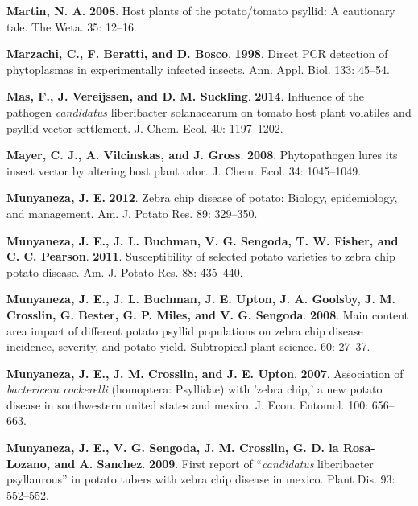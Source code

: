 \documentclass[]{article}
\begin{document}
\leavevmode\hypertarget{ref-Martin2008}{}%
\textbf{Martin, N. A.} \textbf{2008}. Host plants of the potato/tomato
psyllid: A cautionary tale. The Weta. 35: 12--16.

\leavevmode\hypertarget{ref-Marzachi1998}{}%
\textbf{Marzachi, C., F. Beratti, and D. Bosco}. \textbf{1998}. Direct
PCR detection of phytoplasmas in experimentally infected insects. Ann.
Appl. Biol. 133: 45--54.

\leavevmode\hypertarget{ref-Mas2014}{}%
\textbf{Mas, F., J. Vereijssen, and D. M. Suckling}. \textbf{2014}.
Influence of the pathogen \emph{candidatus} liberibacter solanacearum on
tomato host plant volatiles and psyllid vector settlement. J. Chem.
Ecol. 40: 1197--1202.

\leavevmode\hypertarget{ref-Mayer2008}{}%
\textbf{Mayer, C. J., A. Vilcinskas, and J. Gross}. \textbf{2008}.
Phytopathogen lures its insect vector by altering host plant odor. J.
Chem. Ecol. 34: 1045--1049.

\leavevmode\hypertarget{ref-Munyaneza2012b}{}%
\textbf{Munyaneza, J. E.} \textbf{2012}. Zebra chip disease of potato:
Biology, epidemiology, and management. Am. J. Potato Res. 89: 329--350.

\leavevmode\hypertarget{ref-Munyaneza2011}{}%
\textbf{Munyaneza, J. E., J. L. Buchman, V. G. Sengoda, T. W. Fisher,
and C. C. Pearson}. \textbf{2011}. Susceptibility of selected potato
varieties to zebra chip potato disease. Am. J. Potato Res. 88: 435--440.

\leavevmode\hypertarget{ref-Munyaneza2008}{}%
\textbf{Munyaneza, J. E., J. L. Buchman, J. E. Upton, J. A. Goolsby, J.
M. Crosslin, G. Bester, G. P. Miles, and V. G. Sengoda}. \textbf{2008}.
Main content area impact of different potato psyllid populations on
zebra chip disease incidence, severity, and potato yield. Subtropical
plant science. 60: 27--37.

\leavevmode\hypertarget{ref-Munyaneza2007a}{}%
\textbf{Munyaneza, J. E., J. M. Crosslin, and J. E. Upton}.
\textbf{2007}. Association of \emph{bactericera cockerelli} (homoptera:
Psyllidae) with 'zebra chip,' a new potato disease in southwestern
united states and mexico. J. Econ. Entomol. 100: 656--663.

\leavevmode\hypertarget{ref-Munyaneza2009}{}%
\textbf{Munyaneza, J. E., V. G. Sengoda, J. M. Crosslin, G. D. la
Rosa-Lozano, and A. Sanchez}. \textbf{2009}. First report of
``\emph{candidatus} liberibacter psyllaurous'' in potato tubers with
zebra chip disease in mexico. Plant Dis. 93: 552--552.
\end{document}
